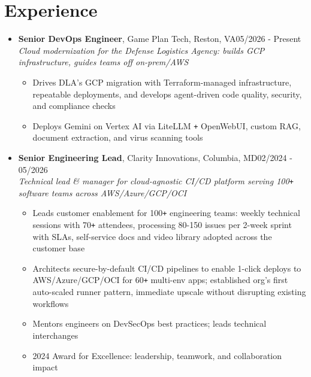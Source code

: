 \documentclass[10pt]{extarticle}
\begin{document}
\section{Experience} 
\begin{itemize}
    \itemsep0.1em
    \item \textbf{Senior DevOps Engineer}, Game Plan Tech, Reston, VA\hfill 05/2026 - Present \\ \emph{Cloud modernization for the Defense Logistics Agency: builds GCP infrastructure, guides teams off on-prem/AWS}
    \begin{itemize}
        \itemsep0em
        \item Drives DLA's GCP migration with Terraform-managed infrastructure, repeatable deployments, and develops agent-driven code quality, security, and compliance checks
        \item Deploys Gemini on Vertex AI via LiteLLM \verb!+! OpenWebUI, custom RAG, document extraction, and virus scanning tools
    \end{itemize}
    
    \item \textbf{Senior Engineering Lead}, Clarity Innovations, Columbia, MD\hfill 02/2024 - 05/2026 \\ \emph{ Technical lead \& manager for cloud-agnostic CI/CD platform serving 100\texttt{+} software teams across AWS/Azure/GCP/OCI}
    \begin{itemize}
        \itemsep0em
        \item Leads customer enablement for 100\verb!+! engineering teams: weekly technical sessions with 70\verb!+! attendees, processing 80-150 issues per 2-week sprint with SLAs, self-service docs and video library adopted across the customer base
        \item Architects secure-by-default CI/CD pipelines to enable 1-click deploys to AWS/Azure/GCP/OCI for 60\verb!+! multi-env apps; established org's first auto-scaled runner pattern, immediate upscale without disrupting existing workflows
        \item Mentors engineers on DevSecOps best practices; leads technical interchanges
        \item 2024 Award for Excellence: leadership, teamwork, and collaboration impact
    \end{itemize}
    

\end{itemize}
\end{document}
